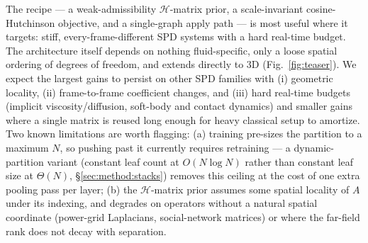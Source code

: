 \documentclass[acmtog]{acmart}
\theoremstyle{plain}
\begin{document}
The recipe --- a weak-admissibility $\mathcal{H}$-matrix prior, a scale-invariant
cosine-Hutchinson objective, and a single-graph apply path --- is most useful where it
targets: stiff, every-frame-different SPD systems with a hard real-time budget. The
architecture itself depends on nothing fluid-specific, only a loose spatial ordering of
degrees of freedom, and extends directly to 3D (Fig.~\ref{fig:teaser}). We expect the
largest gains to persist on other SPD families with (i) geometric locality, (ii)
frame-to-frame coefficient changes, and (iii) hard real-time budgets (implicit
viscosity/diffusion, soft-body and contact dynamics) and smaller gains where a single
matrix is reused long enough for heavy classical setup to amortize. Two known
limitations are worth flagging: (a) training pre-sizes the partition to a maximum $N$,
so pushing past it currently requires retraining --- a dynamic-partition variant
(constant leaf count at $O(N\log N)$ rather than constant leaf size at $\Theta(N)$,
\S\ref{sec:method:stacks}) removes this ceiling at the cost of one extra pooling pass
per layer; (b) the $\mathcal{H}$-matrix prior assumes some spatial locality of $A$
under its indexing, and degrades on operators without a natural spatial coordinate
(power-grid Laplacians, social-network matrices) or where the far-field rank does not
decay with separation.




\clearpage
\twocolumn

\renewcommand{\topfraction}{0.99}
\renewcommand{\bottomfraction}{0.99}
\renewcommand{\textfraction}{0.0}
\renewcommand{\floatpagefraction}{0.6}
\end{document}
